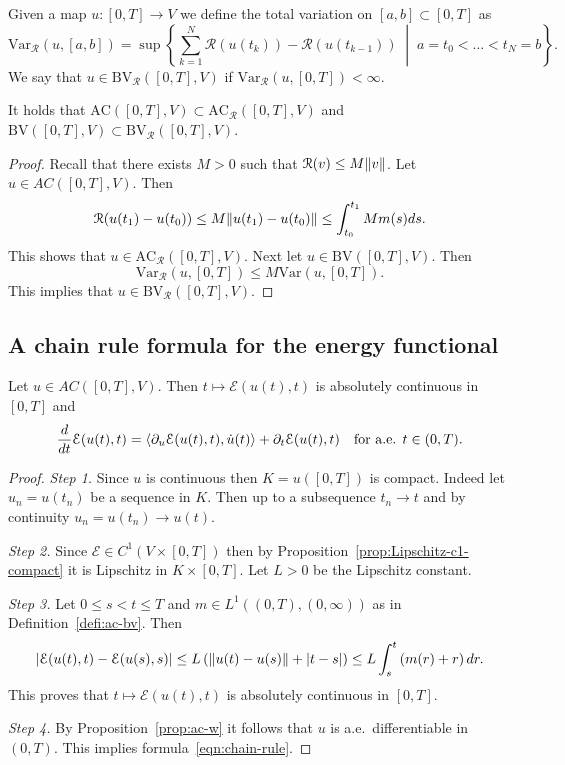 Given a map $u\colon[0,T]\to V$ we define the total variation on $[a,b]\subset[0,T]$ as
\begin{equation*}
\text{Var}_\mathcal{R}(u,[a,b])=\sup\left\{\sum_{k=1}^N\mathcal{R}(u(t_k))-\mathcal{R}(u(t_{k-1}))\;\middle|\;a=t_0<\dots<t_N=b\right\}.
\end{equation*}
We say that $u\in\text{BV}_\mathcal{R}([0,T],V)$ if $\text{Var}_\mathcal{R}(u,[0,T])<\infty$.
\begin{lemma}
It holds that $\text{AC}([0,T],V)\subset\text{AC}_\mathcal{R}([0,T],V)$ and $\text{BV}([0,T],V)\subset\text{BV}_\mathcal{R}([0,T],V)$.
\end{lemma}
\begin{proof}
Recall that there exists $M>0$ such that $\mathcal{R}(v)\le M\lVert v\rVert$. Let $u\in AC([0,T],V)$. Then
\[
\mathcal{R}(u(t_1)-u(t_0))\le M\lVert u(t_1)-u(t_0)\rVert\le\int_{t_0}^{t_1}Mm(s)ds.
\]
This shows that $u\in\text{AC}_\mathcal{R}([0,T],V)$. Next let $u\in\text{BV}([0,T],V)$. Then
\[
\text{Var}_\mathcal{R}(u,[0,T])\le M\text{Var}(u,[0,T]).
\]
This implies that $u\in\text{BV}_\mathcal{R}([0,T],V)$.
\end{proof}

\subsection{A chain rule formula for the energy functional}

\begin{prop}
Let $u\in AC([0,T],V)$. Then $t\mapsto\mathcal{E}(u(t),t)$ is absolutely continuous in $[0,T]$ and
\begin{equation}
\label{eqn:chain-rule}
\frac{d}{dt}\mathcal{E}(u(t),t)=\langle\partial_u\mathcal{E}(u(t),t),\dot u(t)\rangle+\partial_t\mathcal{E}(u(t),t)\quad\text{for a.e. $t\in(0,T)$}.
\end{equation}
\end{prop}
\begin{proof}
\emph{Step 1.} Since $u$ is continuous then $K=u([0,T])$ is compact. Indeed let $u_n=u(t_n)$ be a sequence in $K$. Then up to a subsequence $t_n\to t$ and by continuity $u_n=u(t_n)\to u(t)$.

\emph{Step 2.} Since $\mathcal{E}\in C^1(V\times[0,T])$ then by Proposition~\ref{prop:Lipschitz-c1-compact} it is Lipschitz in $K\times[0,T]$. Let $L>0$ be the Lipschitz constant.

\emph{Step 3.} Let $0\le s<t\le T$ and $m\in L^1((0,T),(0,\infty))$ as in Definition~\ref{defi:ac-bv}. Then
\begin{equation*}
|\mathcal{E}(u(t),t)-\mathcal{E}(u(s),s)|\le L\left(\lVert u(t)-u(s)\rVert+|t-s|\right)\le L\int_s^t\left(m(r)+r\right)dr.
\end{equation*}
This proves that $t\mapsto\mathcal{E}(u(t),t)$ is absolutely continuous in $[0,T]$.

\emph{Step 4.} By Proposition~\ref{prop:ac-w} it follows that $u$ is a.e.\ differentiable in $(0,T)$. This implies formula~\eqref{eqn:chain-rule}.
\end{proof}


